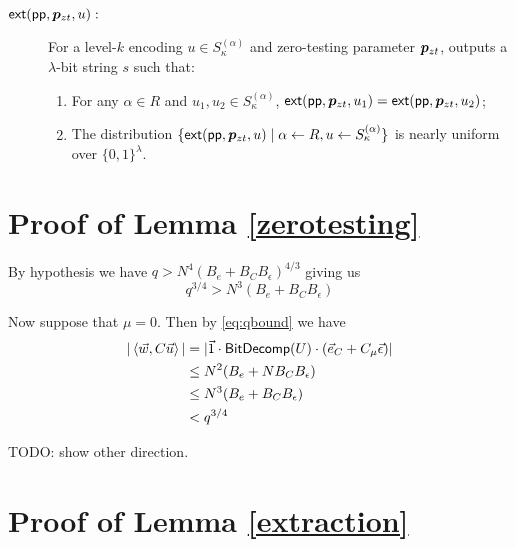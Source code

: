 \begin{definition}
\begin{description}
\item[$\mathsf{ext}(\mathsf{pp}, \bm{p}_{zt}, u):$]  For a level-$k$ encoding $u \in S_\kappa^{(\alpha)}$ and zero-testing parameter $\bm{p}_{zt}$, outputs a $\lambda$-bit string $s$ such that:
\begin{enumerate}
\item For any $\alpha \in R$ and $u_1, u_2 \in S_\kappa^{(\alpha)}$, $\mathsf{ext}(\mathsf{pp}, \bm{p}_{zt}, u_1) = \mathsf{ext}(\mathsf{pp}, \bm{p}_{zt}, u_2)$;
\item The distribution $\{\mathsf{ext}(\mathsf{pp}, \bm{p}_{zt}, u) \mid \alpha \leftarrow R, u \leftarrow S_\kappa^{(\alpha)}\}$ is nearly uniform over $\{0,1\}^\lambda$.
\end{enumerate}
\end{description}
\end{definition}

\section{Proof of Lemma \ref{zerotesting}}
\label{sec:zerotestingproof}

By hypothesis we have $q > N^4 (B_e + B_C B_\epsilon)^{4/3}$ giving us
\begin{equation}
\label{eq:qbound}
q^{3/4} > N^3 (B_e + B_C B_\epsilon)
\end{equation}

Now suppose that $\mu = 0$.  Then by \eqref{eq:qbound} we have 
\begin{align*}
|\left<\vec{w}, C\vec{u}\right>| &= |\vec{1}\cdot \mathsf{BitDecomp}(U)\cdot (\vec{e}_C + C_\mu\vec{\epsilon})|\\
&\leq N^2 (B_e + N B_C B_\epsilon)\\
&\leq N^3 (B_e + B_C B_\epsilon)\\
&< q^{3/4}
\end{align*}

TODO: show other direction.


\section{Proof of Lemma \ref{extraction}}
